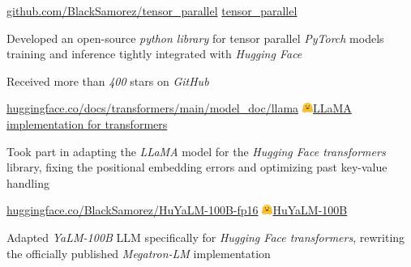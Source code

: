 
\begin{cventries}
  \cventry
    {\href{https://github.com/BlackSamorez/tensor_parallel}{\url{github.com/BlackSamorez/tensor_parallel}}} %
    {\faGithub\acvHeaderIconSep\href{https://github.com/BlackSamorez/tensor_parallel}{tensor\_parallel}} %
    {} %
    {} %
    {
      \begin{cvitems} %
        \item { Developed an open-source \textit{python library} for tensor parallel \textit{PyTorch} models training and inference tightly integrated with \textit{Hugging Face} }
        \item { Received more than \textit{400} stars on \textit{GitHub} }
      \end{cvitems}
    }

  \cventry
    {\href{https://huggingface.co/docs/transformers/main/model_doc/llama}{\url{huggingface.co/docs/transformers/main/model_doc/llama}}} %
    {\includegraphics[width=3.5mm]{hf.jpg}\acvHeaderIconSep\href{https://huggingface.co/docs/transformers/main/model_doc/llama}{LLaMA implementation for transformers}} %
    {} %
    {} %
    {
      \begin{cvitems} %
        \item {Took part in adapting the \textit{LLaMA} model for the \textit{Hugging Face transformers} library, fixing the positional embedding errors and optimizing past key-value handling}
      \end{cvitems}
    }

  \cventry
    {\href{https://huggingface.co/BlackSamorez/HuYaLM-100B-fp16}{\url{huggingface.co/BlackSamorez/HuYaLM-100B-fp16}}} %
    {\includegraphics[width=3.5mm]{hf.jpg}\acvHeaderIconSep\href{https://huggingface.co/BlackSamorez/HuYaLM-100B-fp16}{HuYaLM-100B}} %
    {} %
    {} %
    {
      \begin{cvitems} %
        \item { Adapted \textit{YaLM-100B} LLM specifically for \textit{Hugging Face transformers}, rewriting the officially published \textit{Megatron-LM} implementation }
      \end{cvitems}
    }
    

\end{cventries}
